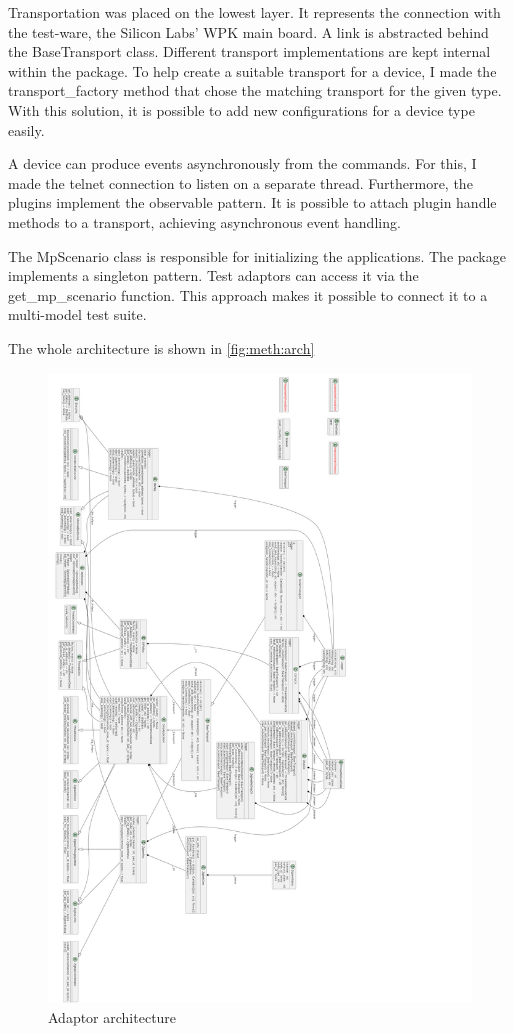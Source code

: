 Transportation was placed on the lowest layer. It represents the connection with the test-ware, the Silicon Labs' WPK main board. A link is abstracted behind the BaseTransport class. Different transport implementations are kept internal within the package. To help create a suitable transport for a device, I made the transport\_factory method that chose the matching transport for the given type. With this solution, it is possible to add new configurations for a device type easily.

A device can produce events asynchronously from the commands. For this, I made the telnet connection to listen on a separate thread. Furthermore, the plugins implement the observable pattern. It is possible to attach plugin handle methods to a transport, achieving asynchronous event handling.

The MpScenario class is responsible for initializing the applications. The package implements a singleton pattern. Test adaptors can access it via the get\_mp\_scenario function. This approach makes it possible to connect it to a multi-model test suite.

The whole architecture is shown in \autoref{fig:meth:arch}

\begin{figure}
    \centering
    \includegraphics[width=140mm, keepaspectratio]{figures/classes.png}
    \caption{Adaptor architecture}
    \label{fig:meth:arch}
\end{figure}

